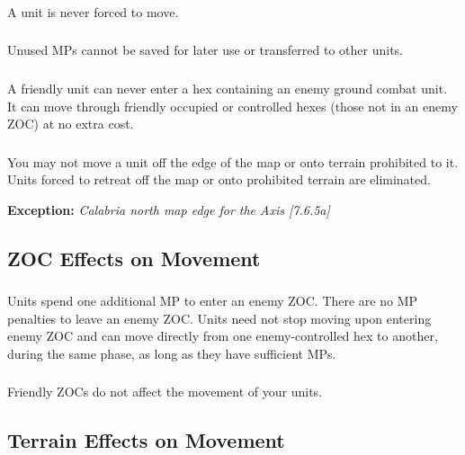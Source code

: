 \subsubsection{}
A unit is never forced to move.

\subsubsection{}
Unused MPs cannot be saved for later use or transferred to other units.

\subsubsection{}
A friendly unit can never enter a hex containing an enemy ground combat unit. It can move through friendly occupied or controlled hexes (those not in an enemy ZOC) at no extra cost.

\subsubsection{}
You may not move a unit off the edge of the map or onto terrain prohibited to it. Units forced to retreat off the map or onto prohibited terrain are eliminated.

\textbf{Exception:} \textit{Calabria north map edge for the Axis [7.6.5a]}

\subsection{ZOC Effects on Movement}

\subsubsection{}
Units spend one additional MP to enter an enemy ZOC. There are no MP penalties to leave an enemy ZOC. Units need not stop moving upon entering enemy ZOC and can move directly from one enemy-controlled hex to another, during the same phase, as long as they have sufficient MPs.

\subsubsection{}
Friendly ZOCs do not affect the movement of your units.

\subsection{Terrain Effects on Movement}

